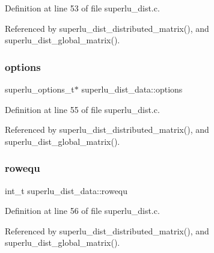 Definition at line 53 of file superlu\+\_\+dist.\+c.



Referenced by superlu\+\_\+dist\+\_\+distributed\+\_\+matrix(), and superlu\+\_\+dist\+\_\+global\+\_\+matrix().

\mbox{\label{structsuperlu__dist__data_ac603ef3b87943cf1d1fe732bea09fc3d}} 
\subsubsection{\texorpdfstring{options}{options}}
{\footnotesize\ttfamily superlu\+\_\+options\+\_\+t$\ast$ superlu\+\_\+dist\+\_\+data\+::options}



Definition at line 55 of file superlu\+\_\+dist.\+c.



Referenced by superlu\+\_\+dist\+\_\+distributed\+\_\+matrix(), and superlu\+\_\+dist\+\_\+global\+\_\+matrix().

\mbox{\label{structsuperlu__dist__data_a37b3cd09e40a3a8853bc633592b71baa}} 
\subsubsection{\texorpdfstring{rowequ}{rowequ}}
{\footnotesize\ttfamily int\+\_\+t superlu\+\_\+dist\+\_\+data\+::rowequ}



Definition at line 56 of file superlu\+\_\+dist.\+c.



Referenced by superlu\+\_\+dist\+\_\+distributed\+\_\+matrix(), and superlu\+\_\+dist\+\_\+global\+\_\+matrix().

\mbox{\label{structsuperlu__dist__data_a357d3c922a6b07cdd542636eea85eb7e}} 
